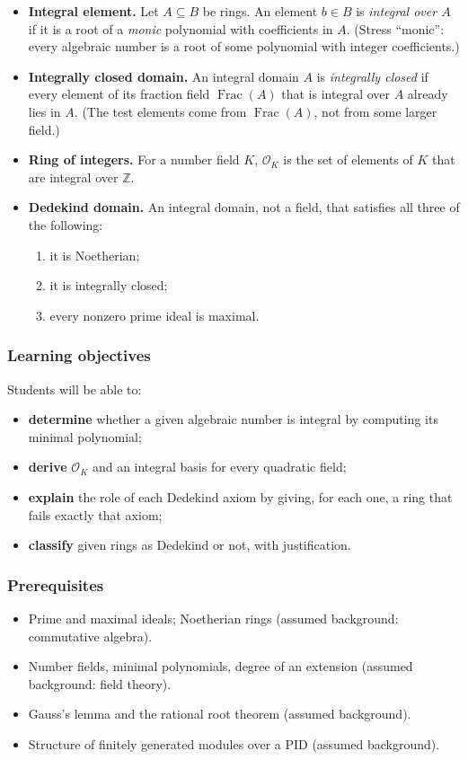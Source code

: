 \documentclass[11pt]{article}
\newcommand{\Z}{\mathbb{Z}}
\newcommand{\OK}{\mathcal{O}_K}
\DeclareMathOperator{\Frac}{Frac}
\begin{document}
\begin{keydefs}
\begin{itemize}
  \item \textbf{Integral element.} Let $A\subseteq B$ be rings. An element $b\in B$ is \emph{integral over $A$} if it is a root of a \emph{monic} polynomial with coefficients in $A$. (Stress ``monic'': every algebraic number is a root of some polynomial with integer coefficients.)
  \item \textbf{Integrally closed domain.} An integral domain $A$ is \emph{integrally closed} if every element of its fraction field $\Frac(A)$ that is integral over $A$ already lies in $A$. (The test elements come from $\Frac(A)$, not from some larger field.)
  \item \textbf{Ring of integers.} For a number field $K$, $\OK$ is the set of elements of $K$ that are integral over $\Z$.
  \item \textbf{Dedekind domain.} An integral domain, not a field, that satisfies all three of the following:
  \begin{enumerate}[label=(\roman*)]
    \item it is Noetherian;
    \item it is integrally closed;
    \item every nonzero prime ideal is maximal.
  \end{enumerate}
\end{itemize}
\end{keydefs}

\subsubsection*{Learning objectives}
Students will be able to:
\begin{itemize}
  \item \textbf{determine} whether a given algebraic number is integral by computing its minimal polynomial;
  \item \textbf{derive} $\OK$ and an integral basis for every quadratic field;
  \item \textbf{explain} the role of each Dedekind axiom by giving, for each one, a ring that fails exactly that axiom;
  \item \textbf{classify} given rings as Dedekind or not, with justification.
\end{itemize}

\subsubsection*{Prerequisites}
\begin{itemize}
  \item Prime and maximal ideals; Noetherian rings (assumed background: commutative algebra).
  \item Number fields, minimal polynomials, degree of an extension (assumed background: field theory).
  \item Gauss's lemma and the rational root theorem (assumed background).
  \item Structure of finitely generated modules over a PID (assumed background).
\end{itemize}
\end{document}
